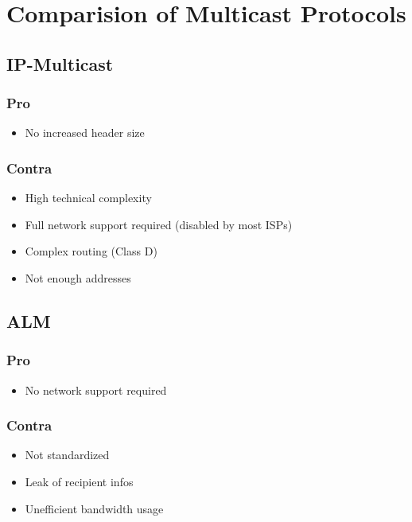 \chapter{Comparision of Multicast Protocols}


\section*{IP-Multicast}
\subsection*{Pro}
\begin{itemize}\itemsep0em
	\item No increased header size
\end{itemize}

\subsection*{Contra}
\begin{itemize}\itemsep0em
	\item High technical complexity
	\item Full network support required (disabled by most ISPs)
	\item Complex routing (Class D)
	\item Not enough addresses
\end{itemize}


\section*{ALM}
\subsection*{Pro}
\begin{itemize}\itemsep0em
    \item No network support required
\end{itemize}

\subsection*{Contra}
\begin{itemize}\itemsep0em
    \item Not standardized
    \item Leak of recipient infos
    \item Unefficient bandwidth usage
\end{itemize}


